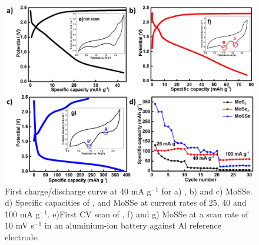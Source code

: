 \begin{figure}[htb!]
\centering
\includegraphics[width=\textwidth]{Figures/chap4fig/CDCCV}
\caption{First charge/discharge curve at 40 mA g$^{-1}$ for a) , b)  and c) MoSSe. d) Specific capacities of ,  and MoSSe at current rates of 25, 40 and 100 mA g$^{-1}$. e)First CV scan of , f)  and g) MoSSe at a scan rate of 10 mV s$^{-1}$ in an aluminium-ion battery against Al reference electrode.}
\label{Figures/chap4fig:CDCCV}
\end{figure} 

